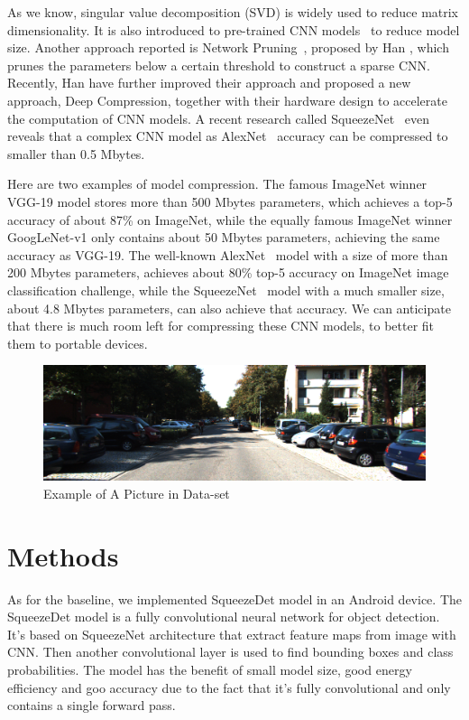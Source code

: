 \documentclass[10pt,twocolumn,letterpaper]{article}
\begin{document}
As we know, singular value decomposition (SVD) is widely used to reduce matrix dimensionality. It is also introduced to pre-trained CNN models~\cite{denton2014exploiting} to reduce model size. Another approach reported is Network Pruning~\cite{han2015learning}, proposed by Han \etal, which prunes the parameters below a certain threshold to construct a sparse CNN. Recently, Han \etal have further improved their approach and proposed a new approach, Deep Compression, together with their hardware design to accelerate the computation of CNN models. A recent research called SqueezeNet~\cite{iandola2016squeezenet} even reveals that a complex CNN model as AlexNet~\cite{krizhevsky2012imagenet} accuracy can be compressed to smaller than 0.5 Mbytes.

Here are two examples of model compression. The famous ImageNet winner VGG-19 model stores more than 500 Mbytes parameters, which achieves a top-5 accuracy of about 87\% on ImageNet, while the equally famous ImageNet winner GoogLeNet-v1 only contains about 50 Mbytes parameters, achieving the same accuracy as VGG-19. The well-known AlexNet~\cite{krizhevsky2012imagenet} model with a size of more than 200 Mbytes parameters, achieves about 80\% top-5 accuracy on ImageNet image classification challenge, while the SqueezeNet~\cite{iandola2016squeezenet} model with a much smaller size, about 4.8 Mbytes parameters, can also achieve that accuracy. We can anticipate that there is much room left for compressing these CNN models, to better fit them to portable devices.

\begin{figure}[ht]
\begin{center}
\includegraphics[width=1.0\linewidth]{fig/007480.png}
\end{center}
\caption{Example of A Picture in Data-set}
\label{fig:example}
\end{figure}

\section{Methods}
As for the baseline, we implemented SqueezeDet model in an Android device. The SqueezeDet model is a fully convolutional neural network for object detection. It's based on SqueezeNet architecture that extract feature maps from image with CNN. Then another convolutional layer is used to find bounding boxes and class probabilities. The model has the benefit of small model size, good energy efficiency and goo accuracy due to the fact that it's fully convolutional and only contains a single forward pass.
\end{document}
